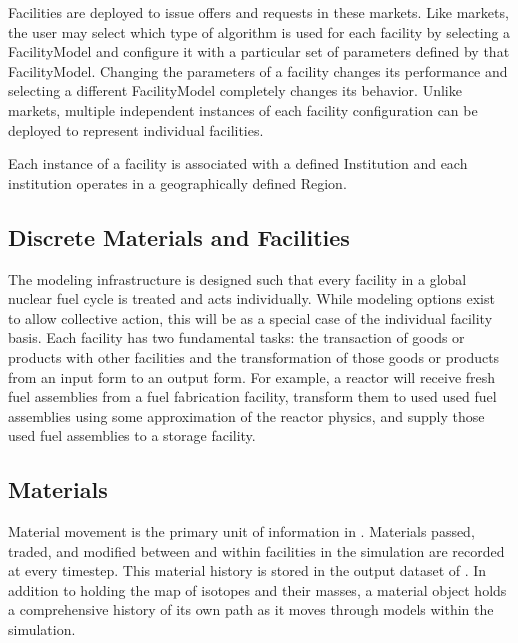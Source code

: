Facilities are deployed to issue offers and requests in these markets.  
Like markets, the user may select which type of algorithm is used for 
each facility by selecting a FacilityModel and configure it with a 
particular set of parameters defined by that FacilityModel.  Changing 
the parameters of a facility changes its performance and selecting a 
different FacilityModel completely changes its behavior.  Unlike 
markets, multiple independent instances of each facility configuration 
can be deployed to represent individual facilities.

Each instance of a facility is associated with a defined Institution 
and each institution operates in a geographically defined Region.

\subsection{Discrete Materials and Facilities}

The \Cyclus modeling infrastructure is designed such that every
facility in a global nuclear fuel cycle is treated and acts
individually. While modeling options exist to allow collective
action, this will be as a special case of the individual facility
basis. Each facility has two fundamental tasks: the transaction of
goods or products with other facilities and the transformation of
those goods or products from an input form to an output form.  For
example, a reactor will receive fresh fuel assemblies from a fuel
fabrication facility, transform them to used used fuel assemblies
using some approximation of the reactor physics, and supply those used
fuel assemblies to a storage facility.

\subsection{Materials}

Material movement is the primary unit of information in \Cyclus.  
Materials passed, traded, and modified between and within facilities 
in the simulation are recorded at every timestep.  This material 
history is stored in the output dataset of \Cyclus. In addition to 
holding the map of isotopes and their masses, a material object holds 
a comprehensive history of its own path as it moves through models 
within the simulation. 

